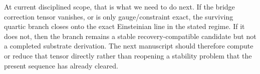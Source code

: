 \documentclass[11pt]{article}
\begin{document}
At current disciplined scope, that is what we need to do next. If the bridge correction tensor vanishes, or is only gauge/constraint exact, the surviving quartic branch closes onto the exact Einsteinian line in the stated regime. If it does not, then the branch remains a stable recovery-compatible candidate but not a completed substrate derivation. The next manuscript should therefore compute or reduce that tensor directly rather than reopening a stability problem that the present sequence has already cleared.
\end{document}
